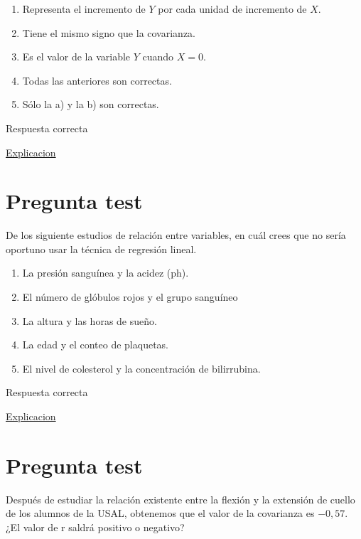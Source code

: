 \documentclass[
]{book}
\providecommand{\tightlist}{%
  \setlength{\itemsep}{0pt}\setlength{\parskip}{0pt}}
\begin{document}
\begin{enumerate}
\def\labelenumi{\alph{enumi})}
\tightlist
\item
  Representa el incremento de \(Y\) por cada unidad de incremento de \(X\).
\item
  Tiene el mismo signo que la covarianza.
\item
  Es el valor de la variable \(Y\) cuando \(X=0\).
\item
  Todas las anteriores son correctas.
\item
  Sólo la a) y la b) son correctas.
\end{enumerate}

Respuesta correcta

\href{https://1fjmanzano.github.io/bioestadistica/relaci\%C3\%B3n-entre-variables-nume\%CC\%81ricas.html\#regresio\%CC\%81n-lineal}{Explicacion}

\hypertarget{pregunta-test-136}{%
\section{Pregunta test}\label{pregunta-test-136}}

De los siguiente estudios de relación entre variables, en cuál crees que no sería oportuno usar la técnica de regresión lineal.

\begin{enumerate}
\def\labelenumi{\alph{enumi})}
\tightlist
\item
  La presión sanguínea y la acidez (ph).
\item
  El número de glóbulos rojos y el grupo sanguíneo
\item
  La altura y las horas de sueño.
\item
  La edad y el conteo de plaquetas.
\item
  El nivel de colesterol y la concentración de bilirrubina.
\end{enumerate}

Respuesta correcta

\href{https://es.cochrane.org/es/divulgacion/pensamiento-critico/correlacion-no-implica-causalidad}{Explicacion}

\hypertarget{pregunta-test-137}{%
\section{Pregunta test}\label{pregunta-test-137}}

Después de estudiar la relación existente entre la flexión y la extensión de cuello de los alumnos de la USAL, obtenemos que el valor de la covarianza es \(-0,57\). ¿El valor de r saldrá positivo o negativo?
\end{document}
